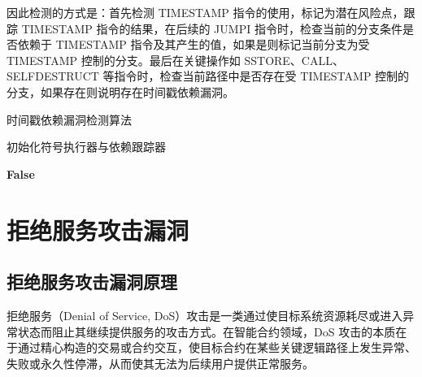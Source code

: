 \documentclass[print, master, vlined, timesmath]{DissertUESTC}
\begin{document}
因此检测的方式是：首先检测 TIMESTAMP 指令的使用，标记为潜在风险点，跟踪 TIMESTAMP 指令的结果，在后续的 JUMPI 指令时，检查当前的分支条件是否依赖于 TIMESTAMP 指令及其产生的值，如果是则标记当前分支为受 TIMESTAMP 控制的分支。最后在关键操作如 SSTORE、CALL、SELFDESTRUCT 等指令时，检查当前路径中是否存在受 TIMESTAMP 控制的分支，如果存在则说明存在时间戳依赖漏洞。


\begin{algorithm}[H]
    \caption{时间戳依赖漏洞检测算法}
    
    初始化符号执行器与依赖跟踪器\;
    
    
    \Return \textbf{False}
    \end{algorithm}
    
\section{拒绝服务攻击漏洞}
\subsection{拒绝服务攻击漏洞原理}

拒绝服务（Denial of Service, DoS）攻击是一类通过使目标系统资源耗尽或进入异常状态而阻止其继续提供服务的攻击方式。在智能合约领域，DoS 攻击的本质在于通过精心构造的交易或合约交互，使目标合约在某些关键逻辑路径上发生异常、失败或永久性停滞，从而使其无法为后续用户提供正常服务。
\end{document}
